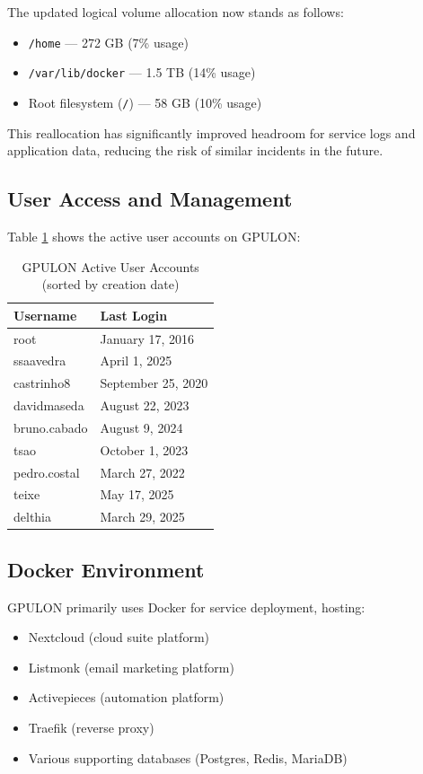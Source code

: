 The updated logical volume allocation now stands as follows:

\begin{itemize}
    \item \texttt{/home} — 272 GB (7\% usage)
    \item \texttt{/var/lib/docker} — 1.5 TB (14\% usage)
    \item Root filesystem (\texttt{/}) — 58 GB (10\% usage)
\end{itemize}

This reallocation has significantly improved headroom for service logs and application data, reducing the risk of similar incidents in the future.

\subsection{User Access and Management}

Table \ref{tab:gpulon_users} shows the active user accounts on GPULON:

\begin{table}[H]
  \centering
  \caption{GPULON Active User Accounts (sorted by creation date)}
  \label{tab:gpulon_users}
  \begin{tabular}{ll}
    \rowcolor{udcpink!25}
    \textbf{Username} & \textbf{Last Login} \\
    \hline
    root & January 17, 2016 \\
    ssaavedra & April 1, 2025 \\
    castrinho8 & September 25, 2020 \\
    davidmaseda & August 22, 2023 \\
    bruno.cabado & August 9, 2024 \\
    tsao & October 1, 2023 \\
    pedro.costal & March 27, 2022 \\
    teixe & May 17, 2025 \\
    delthia & March 29, 2025 \\
  \end{tabular}
\end{table}

\subsection{Docker Environment}

GPULON primarily uses Docker for service deployment, hosting:
\begin{itemize}
  \item Nextcloud (cloud suite platform)
  \item Listmonk (email marketing platform)
  \item Activepieces (automation platform)
  \item Traefik (reverse proxy)
  \item Various supporting databases (Postgres, Redis, MariaDB)
\end{itemize}

